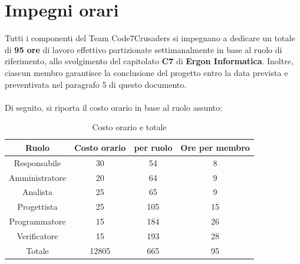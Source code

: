 \documentclass{article}
\begin{document}
\section{Impegni orari}
\label{sec:introduzione}
Tutti i componenti del Team Code7Crusaders si impegnano a dedicare un totale di \textbf{95 ore} di lavoro effettivo partizionate 
settimanalmente in base al ruolo di riferimento, allo svolgimento del capitolato \textbf{C7} di \textbf{Ergon Informatica}. Inoltre,
ciascun membro garantisce la conclusione del progetto entro la data prevista e preventivata nel paragrafo 5 di questo documento.
\\
\\
Di seguito, si riporta il costo orario in base al ruolo assunto:
\begin{table}[!h]
	\begin{center}
		\begin{tabular}{ |c|c|c|c| }
			\hline
			Ruolo          & Costo orario &  per ruolo   & Ore per membro \\
			\hline          
			Responsabile   & 30           &     54       &       8        \\
			Amministratore & 20           &     64       &       9        \\
			Analista       & 25           &     65       &       9       \\
			Progettista    & 25           &     105      &       15       \\
			Programmatore  & 15           &     184      &       26       \\
			Verificatore   & 15           &     193      &       28       \\
			\hline
			Totale         &    12805    &     665       &       95       \\
			\hline
		\end{tabular}
        \caption{Costo orario e totale}
    \end{center}
\end{table}

\newpage
\end{document}

